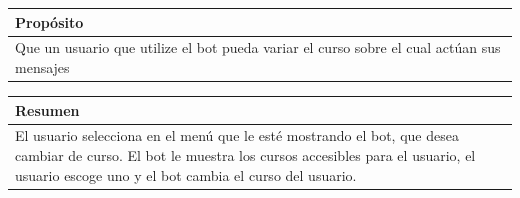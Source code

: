 \begin{table}[!ht]

\begin{tabular}{|m{10cm}|}
\hline\rowcolor{Gray}
{\bf Propósito}\\
\hline
{Que un usuario que utilize el bot pueda variar el curso sobre el cual actúan sus mensajes} \\
\hline

\end{tabular}


\end{table}

\begin{table}[!ht]

\begin{tabular}{|m{10cm}|}
\hline\rowcolor{Gray}
{\bf Resumen}\\
\hline
{El usuario selecciona en el menú que le esté mostrando el bot, que desea cambiar de curso. El bot le muestra los cursos accesibles para el usuario, el usuario escoge uno y el bot cambia el curso del usuario.} \\
\hline

\end{tabular}



\end{table}



